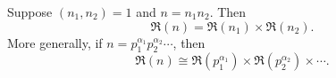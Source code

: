 Suppose $(n_1, n_2) = 1$ and $n = n_1 n_2$. Then
$$\mathfrak{R}(n) = \mathfrak{R}(n_1) \times \mathfrak{R}(n_2).$$
More generally, if $n = p_1^{\alpha_1} p_2^{\alpha_2} \cdots$, then
$$\mathfrak{R}(n) \cong \mathfrak{R}(p_1^{\alpha_1}) \times \mathfrak{R}(p_2^{\alpha_2}) \times \cdots.$$
